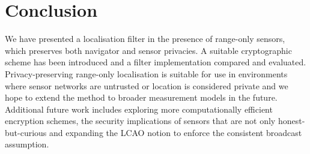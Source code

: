 \documentclass[10pt,letterpaper,oneside,twocolumn,journal]{IEEEtran}
\theoremstyle{definition}
\theoremstyle{definition}
\theoremstyle{remark}
\begin{document}
\section{Conclusion} \label{sec:conclusion}
We have presented a localisation filter in the presence of range-only sensors, which preserves both navigator and sensor privacies. A suitable cryptographic scheme has been introduced and a filter implementation compared and evaluated. Privacy-preserving range-only localisation is suitable for use in environments where sensor networks are untrusted or location is considered private and we hope to extend the method to broader measurement models in the future. Additional future work includes exploring more computationally efficient encryption schemes, the security implications of sensors that are not only honest-but-curious and expanding the LCAO notion to enforce the consistent broadcast assumption.

% 
%                                                                                         
%                                                                                         
%                                                                                         
% 

\appendices
\end{document}
